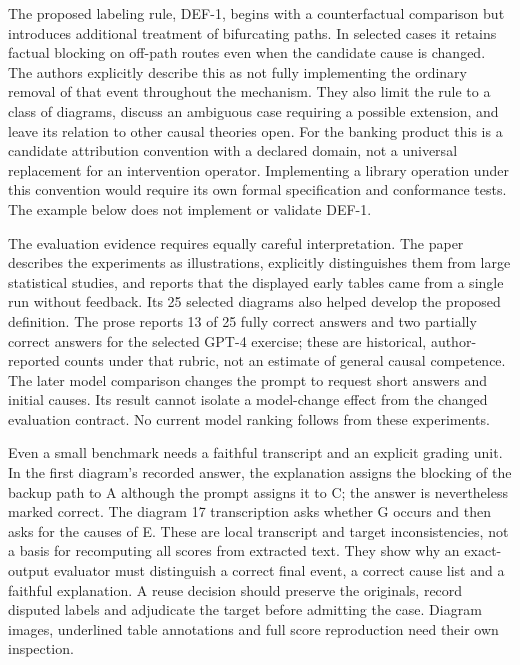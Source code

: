 The proposed labeling rule, DEF-1, begins with a counterfactual comparison
but introduces additional treatment of bifurcating paths. In selected cases it
retains factual blocking on off-path routes even when the candidate cause is
changed. The authors explicitly describe this as not fully implementing the
ordinary removal of that event throughout the mechanism. They also limit
the rule to a class of diagrams, discuss an ambiguous case requiring a
possible extension, and leave its relation to other causal theories open.
For the banking product this is a candidate attribution convention with a
declared domain, not a universal replacement for an intervention operator.
Implementing a library operation under this convention would require its
own formal specification and conformance tests. The example below does not
implement or validate DEF-1.~\citep{exec18_reasoning_neuron}

The evaluation evidence requires equally careful interpretation. The paper
describes the experiments as illustrations, explicitly distinguishes them
from large statistical studies, and reports that the displayed early tables
came from a single run without feedback. Its 25 selected diagrams also
helped develop the proposed definition. The prose reports 13 of 25 fully
correct answers and two partially correct answers for the selected GPT-4
exercise; these are historical, author-reported counts under that rubric,
not an estimate of general causal competence. The later model comparison
changes the prompt to request short answers and initial causes. Its result
cannot isolate a model-change effect from the changed evaluation contract.
No current model ranking follows from these experiments.~\citep{exec18_reasoning_neuron}

Even a small benchmark needs a faithful transcript and an explicit grading
unit. In the first diagram's recorded answer, the explanation assigns the
blocking of the backup path to A although the prompt assigns it to C; the
answer is nevertheless marked correct. The diagram 17 transcription asks
whether G occurs and then asks for the causes of E. These are local
transcript and target inconsistencies, not a basis for recomputing all scores
from extracted text. They show why an exact-output evaluator must distinguish
a correct final event, a correct cause list and a faithful explanation. A
reuse decision should preserve the originals, record disputed labels and
adjudicate the target before admitting the case. Diagram images, underlined
table annotations and full score reproduction need their own inspection.~\citep{exec18_reasoning_neuron}

